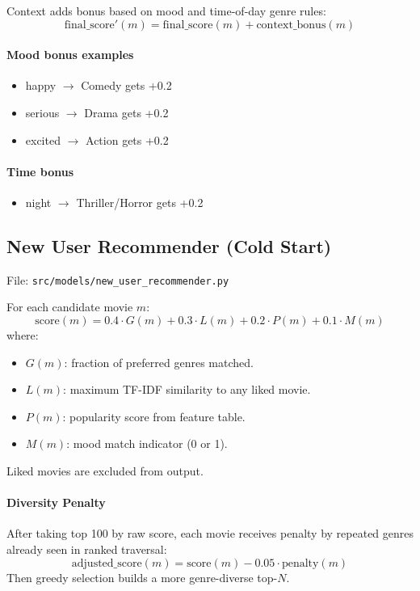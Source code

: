 \documentclass[11pt,a4paper]{article}
\begin{document}
Context adds bonus based on mood and time-of-day genre rules:
\begin{equation}
\text{final\_score}'(m) = \text{final\_score}(m) + \text{context\_bonus}(m)
\end{equation}

\paragraph{Mood bonus examples}
\begin{itemize}[leftmargin=1.5em]
    \item happy $\rightarrow$ Comedy gets +0.2
    \item serious $\rightarrow$ Drama gets +0.2
    \item excited $\rightarrow$ Action gets +0.2
\end{itemize}

\paragraph{Time bonus}
\begin{itemize}[leftmargin=1.5em]
    \item night $\rightarrow$ Thriller/Horror gets +0.2
\end{itemize}

\subsection{New User Recommender (Cold Start)}
File: \texttt{src/models/new\_user\_recommender.py}

For each candidate movie $m$:
\begin{equation}
\text{score}(m)=0.4\cdot G(m)+0.3\cdot L(m)+0.2\cdot P(m)+0.1\cdot M(m)
\end{equation}
where:
\begin{itemize}[leftmargin=1.5em]
    \item $G(m)$: fraction of preferred genres matched.
    \item $L(m)$: maximum TF-IDF similarity to any liked movie.
    \item $P(m)$: popularity score from feature table.
    \item $M(m)$: mood match indicator (0 or 1).
\end{itemize}

Liked movies are excluded from output.

\paragraph{Diversity Penalty}
After taking top 100 by raw score, each movie receives penalty by repeated genres already seen in ranked traversal:
\begin{equation}
\text{adjusted\_score}(m)=\text{score}(m)-0.05\cdot \text{penalty}(m)
\end{equation}
Then greedy selection builds a more genre-diverse top-$N$.
\end{document}
